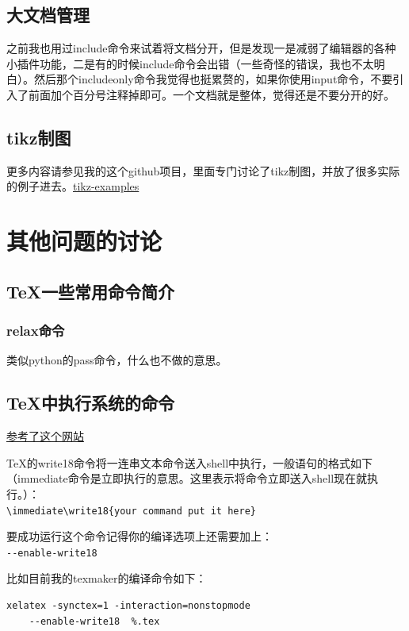 \documentclass[12pt,oneside]{book}
\begin{document}
\begin{common-format}
\section{大文档管理}
之前我也用过include命令来试着将文档分开，但是发现一是减弱了编辑器的各种小插件功能，二是有的时候include命令会出错（一些奇怪的错误，我也不太明白）。然后那个includeonly命令我觉得也挺累赘的，如果你使用input命令，不要引入了前面加个百分号注释掉即可。一个文档就是整体，觉得还是不要分开的好。


\section{tikz制图}
更多内容请参见我的这个github项目，里面专门讨论了tikz制图，并放了很多实际的例子进去。\href{https://github.com/a358003542/tikz-examples}{tikz-examples}







\chapter{其他问题的讨论}
\section{TeX一些常用命令简介}
\subsection{relax命令}
类似python的pass命令，什么也不做的意思。

\section{TeX中执行系统的命令}
\href{http://tex.stackexchange.com/questions/20444/what-are-immediate-write18-and-how-does-one-use-them}{参考了这个网站}

\TeX 的write18命令将一连串文本命令送入shell中执行，一般语句的格式如下（immediate命令是立即执行的意思。这里表示将命令立即送入shell现在就执行。）：\\
\verb+\immediate\write18{your command put it here}+

要成功运行这个命令记得你的编译选项上还需要加上：\\
\verb+--enable-write18+

比如目前我的texmaker的编译命令如下：
\begin{Verbatim}
xelatex -synctex=1 -interaction=nonstopmode 
    --enable-write18  %.tex
\end{Verbatim}



\end{common-format}
\end{document}
